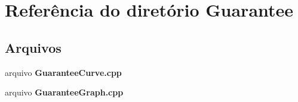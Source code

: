 \section{Referência do diretório Guarantee}
\label{dir_2f633baf6afd86c66bd5297483805e23}
\subsection*{Arquivos}
\begin{DoxyCompactItemize}
\item 
arquivo {\bf Guarantee\+Curve.\+cpp}
\item 
arquivo {\bf Guarantee\+Graph.\+cpp}
\end{DoxyCompactItemize}
